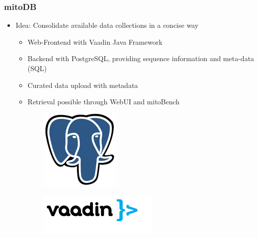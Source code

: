 \documentclass{beamer} %
\begin{document}
\begin{frame}
\frametitle{mitoDB}
\begin{itemize}
\item Idea: Consolidate available data collections in a concise way
	\begin{itemize}
		\item Web-Frontend with Vaadin Java Framework
		\item Backend with PostgreSQL, providing sequence information and meta-data (SQL)
        \item Curated data upload with metadata
        \item Retrieval possible through WebUI and mitoBench
	\end{itemize}
\end{itemize}
\begin{figure}
\centering
    \begin{subfigure}[b]{0.3\textwidth}
        \includegraphics[width=\textwidth]{imagesBench/postgresql.png}
    \end{subfigure}
    \qquad
    \begin{subfigure}[b]{0.3\textwidth}
        \includegraphics[width=\textwidth]{imagesBench/vaadin.png}
    \end{subfigure}
\end{figure}
\end{frame}
\end{document}
